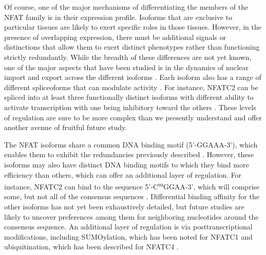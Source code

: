 Of course, one of the major mechanisms of differentiating the members of the NFAT family is in their expression profile. Isoforms that are exclusive to particular tissues are likely to exert specific roles in those tissues. However, in the presence of overlapping expression, there must be additional signals or distinctions that allow them to exert distinct phenotypes rather than functioning strictly redundantly. While the breadth of these differences are not yet known, one of the major aspects that have been studied is in the dynamics of nuclear import and export across the different isoforms \citep{Chow1997, Yissachar2013, Kar2015, Kar2016}. Each isoform also has a range of different spliceoforms that can modulate activity \citep{Vihma2008, Mancini2009}. For instance, NFATC2 can be spliced into at least three functionally distinct isoforms with different ability to activate transcription with one being inhibitory toward the others \citep{Chuvpilo1999}. These levels of regulation are sure to be more complex than we presently understand and offer another avenue of fruitful future study.

The NFAT isoforms share a common DNA binding motif (5'\hyp{}GGAAA\hyp{}3'), which enables them to exhibit the redundancies previously described \citep{Rao1997, Chen1998}. However, these isoforms may also have distinct DNA binding motifs to which they bind more efficiency than others, which can offer an additional layer of regulation. For instance, NFATC2 can bind to the sequence 5'\hyp{}C\textsuperscript{m}GGAA\hyp{}3', which will comprise some, but not all of the consensus sequences \citep{Ray2021}. Differential binding affinity for the other isoforms has not yet been exhaustively detailed, but future studies are likely to uncover preferences among them for neighboring nucleotides around the consensus sequence. An additional layer of regulation is via posttranscriptional modifications, including SUMOylation, which has been noted for NFATC1 and ubiquitination, which has been described for NFATC4 \citep{Fan2008, Xiao2021}.

